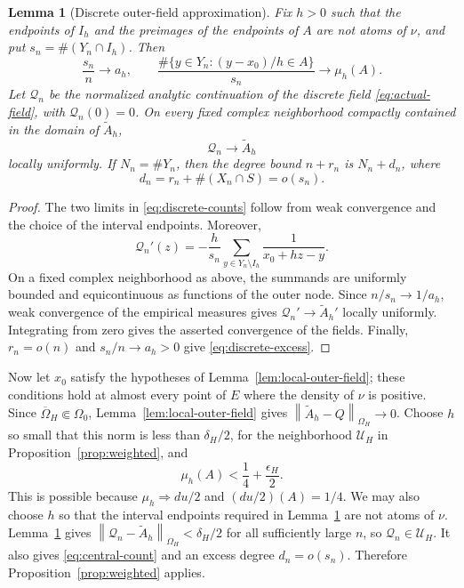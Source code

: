\documentclass[11pt]{article}
\newtheorem{lemma}[theorem]{Lemma}
\theoremstyle{definition}
\numberwithin{equation}{section}
\newcommand{\norm}[1]{\left\lVert #1\right\rVert}
\begin{document}
\begin{lemma}[Discrete outer-field approximation]\label{lem:discrete-field}
Fix \(h>0\) such that the endpoints of \(I_h\) and the preimages of
the endpoints of \(A\) are not atoms of \(\nu\), and put
\(s_n=\#(Y_n\cap I_h)\).
Then
\begin{equation}\label{eq:discrete-counts}
 \frac{s_n}{n}\longrightarrow a_h,
 \qquad
 \frac{\#\{y\in Y_n:(y-x_0)/h\in A\}}{s_n}
 \longrightarrow\mu_h(A).
\end{equation}
Let \(\mathcal Q_n\) be the normalized analytic continuation of the
discrete field \eqref{eq:actual-field}, with \(\mathcal Q_n(0)=0\).
On every fixed complex neighborhood compactly contained in the domain
of \(\widetilde A_h\),
\[
 \mathcal Q_n\longrightarrow\widetilde A_h
\]
locally uniformly. If \(N_n=\#Y_n\), then the degree bound \(n+r_n\)
is \(N_n+d_n\), where
\begin{equation}\label{eq:discrete-excess}
 d_n=r_n+\#(X_n\cap S)=o(s_n).
\end{equation}
\end{lemma}

\begin{proof}
The two limits in \eqref{eq:discrete-counts} follow from weak
convergence and the choice of the interval endpoints. Moreover,
\[
 \mathcal Q_n'(z)
 =-\frac{h}{s_n}\sum_{y\in Y_n\setminus I_h}
   \frac1{x_0+hz-y}.
\]
On a fixed complex neighborhood as above, the summands are uniformly
bounded and equicontinuous as functions of the outer node. Since
\(n/s_n\to1/a_h\), weak convergence of the empirical measures gives
\(\mathcal Q_n'\to\widetilde A_h'\) locally uniformly. Integrating
from zero gives the asserted convergence of the fields. Finally,
\(r_n=o(n)\) and \(s_n/n\to a_h>0\) give
\eqref{eq:discrete-excess}.
\end{proof}

Now let \(x_0\) satisfy the hypotheses of Lemma~\ref{lem:local-outer-field};
these conditions hold at almost every point of \(E\) where the density
of \(\nu\) is positive. Since \(\overline\Omega_H\Subset\Omega_0\),
Lemma~\ref{lem:local-outer-field} gives
\(\norm{\widetilde A_h-Q}_{\Omega_H}\to0\). Choose
\(h\) so small that this norm is less than \(\delta_H/2\), for the
neighborhood \(\mathcal U_H\) in Proposition~\ref{prop:weighted}, and
\[
 \mu_h(A)<\frac14+\frac{\epsilon_H}{2}.
\]
This is possible because \(\mu_h\Rightarrow du/2\) and
\((du/2)(A)=1/4\). We may also choose \(h\) so that the interval
endpoints required in Lemma~\ref{lem:discrete-field} are not atoms of
\(\nu\). Lemma~\ref{lem:discrete-field} gives
\(\norm{\mathcal Q_n-\widetilde A_h}_{\Omega_H}<\delta_H/2\) for all
sufficiently large \(n\), so \(\mathcal Q_n\in\mathcal U_H\).
It also gives \eqref{eq:central-count} and an excess degree
\(d_n=o(s_n)\). Therefore
Proposition~\ref{prop:weighted} applies.
\end{document}
